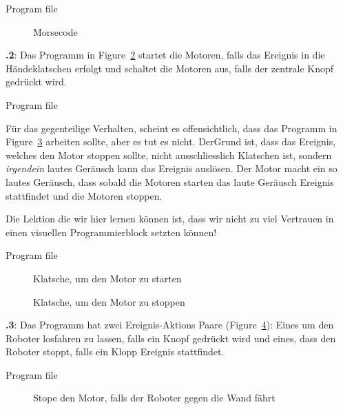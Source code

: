 \documentclass[12pt,a4paper,ngerman]{article}
\begin{document}
{\raggedleft \hfill Program file }

\begin{figure}
\begin{center}
\caption{Morsecode}\label{fig.morse}
\end{center}
\end{figure}


\textbf{\thesection.2}:
Das Programm in Figure~\ref{fig.clap-to-start} startet die Motoren, falls das Ereignis in die Händeklatschen erfolgt und schaltet die Motoren aus, falls der zentrale Knopf gedrückt wird.

{\raggedleft \hfill Program file }

Für das gegenteilige Verhalten, scheint es offensichtlich, dass das Programm in Figure~\ref{fig.clap-to-stop} arbeiten sollte, aber es tut es nicht. DerGrund ist, dass das Ereignis, welches den Motor stoppen sollte, nicht ausschliesslich Klatschen ist, sondern \emph{irgendein} lautes Geräusch kann das Ereignis auslösen. Der Motor macht ein so lautes Geräusch, dass sobald die Motoren starten das laute Geräusch Ereignis stattfindet und die Motoren stoppen.

Die Lektion die wir hier lernen können ist, dass wir nicht zu viel Vertrauen in einen visuellen Programmierblock setzten können!

{\raggedleft \hfill Program file }

\begin{figure}
\begin{center}
\caption{Klatsche, um den Motor zu starten}
\label{fig.clap-to-start}
\end{center}
\end{figure}

\begin{figure}[hbt]
\begin{center}
\caption{Klatsche, um den Motor zu stoppen}\label{fig.clap-to-stop}
\end{center}
\end{figure}

\textbf{\thesection.3}:
Das Programm hat zwei Ereignis-Aktions Paare (Figure~\ref{fig.bump}): Eines um den Roboter losfahren zu lassen, falls ein Knopf gedrückt wird und eines, dass den Roboter stoppt, falls ein Klopp Ereignis stattfindet.

{\raggedleft \hfill Program file }

\begin{figure}[hbt]
\begin{center}
\caption{Stope den Motor, falls der Roboter gegen die Wand fährt}\label{fig.bump}
\end{center}
\end{figure}
\end{document}
